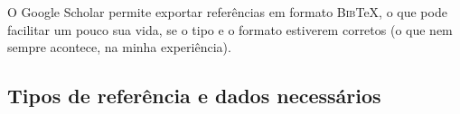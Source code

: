 O Google Scholar permite exportar referências em formato \textsc{Bib}\TeX,
o que pode facilitar um pouco sua vida, se o tipo e o formato estiverem
corretos (o que nem sempre acontece, na minha experiência).

\subsection{Tipos de referência e dados necessários}
\label{bibtex_entries}

\newcommand{\campo}[1]{\hspace*{1em}\texttt{#1}:}
\newcommand{\ttz}[1]{\texttt{#1}}


